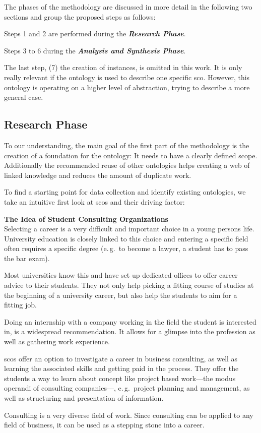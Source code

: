 \documentclass[a4paper, DIV=13, BCOR=0cm]{scrbook}
\newcommand{\eg}{e.\,g.\ }
\newcommand{\pn}[1]{\textit{\textbf{#1}}}
\begin{document}
The phases of the methodology are discussed in more detail in the following two sections and group the proposed steps as follows:

\begin{compactenum}
	\item Steps 1 and 2 are performed during the \pn{Research Phase}.
	\item Steps 3 to 6 during the \pn{Analysis and Synthesis Phase}.
\end{compactenum}

The last step, (7) the creation of instances, is omitted in this work. It is only really relevant if the ontology is used to describe one specific \gls{sco}. However, this ontology is operating on a higher level of abstraction, trying to describe a more general case.

\subsection{Research Phase}
To our understanding, the main goal of the first part of the methodology is the creation of a foundation for the ontology: It needs to have a clearly defined scope. Additionally the recommended reuse of other ontologies helps creating a web of linked knowledge and reduces the amount of duplicate work.

To find a starting point for data collection and identify existing ontologies, we take an intuitive first look at \glspl{sco} and their driving factor:

\begin{mdframed}
	\textbf{The Idea of Student Consulting Organizations}\\
	Selecting a career is a very difficult and important choice in a young persons life. University education is closely linked to this choice and entering a specific field often requires a specific degree (\eg to become a lawyer, a student has to pass the bar exam).

	Most universities know this and have set up dedicated offices to offer career advice to their students. They not only help picking a fitting course of studies at the beginning of a university career, but also help the students to aim for a fitting job.

	Doing an internship with a company working in the field the student is interested in, is a widespread recommendation. It allows for a glimpse into the profession as well as gathering work experience.

	\glspl{sco} offer an option to investigate a career in business consulting, as well as learning the associated skills and getting paid in the process. They offer the students a way to learn about concept like project based work---the modus operandi of consulting companies---, \eg project planning and management, as well as structuring and presentation of information.

	Consulting is a very diverse field of work. Since consulting can be applied to any field of business, it can be used as a stepping stone into a career.
\end{mdframed}
\end{document}
